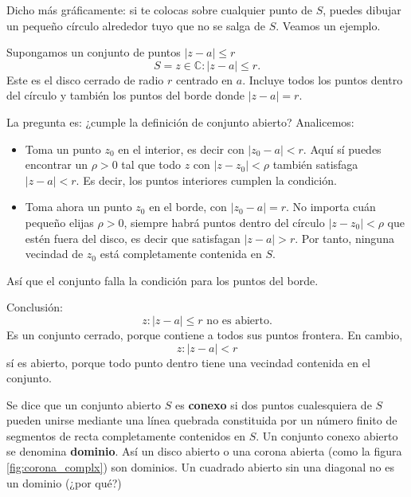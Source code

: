 Dicho más gráficamente: si te colocas sobre cualquier punto de \( S \), puedes dibujar un pequeño círculo alrededor tuyo que no se salga de \( S \). Veamos un ejemplo.
\begin{example}
  Supongamos un conjunto de puntos $\lvert z-a\rvert \leqslant r$
  \[
  S = {z \in \mathbb{C} : |z - a| \leqslant r}.
  \]
  Este es el disco cerrado de radio \(r\) centrado en \(a\). Incluye todos los puntos dentro del círculo y también los puntos del borde donde \(|z - a| = r\).

  La pregunta es: ¿cumple la definición de conjunto abierto? Analicemos:
  \begin{itemize}
  \item Toma un punto \(z_0\) en el interior, es decir con \(|z_0 - a| < r\).
   Aquí sí puedes encontrar un \(\rho > 0\) tal que todo \(z\) con \(|z - z_0| < \rho\) también satisfaga \(|z - a| < r\).
   Es decir, los puntos interiores cumplen la condición.

  \item Toma ahora un punto \(z_0\) en el borde, con \(|z_0 - a| = r\).
    No importa cuán pequeño elijas \(\rho > 0\), siempre habrá puntos dentro del círculo \(|z - z_0| < \rho\) que estén fuera del disco, es decir que satisfagan \(|z - a| > r\).
    Por tanto, ninguna vecindad de \(z_0\) está completamente contenida en \(S\).
  \end{itemize}
  Así que el conjunto falla la condición para los puntos del borde.

  Conclusión:
  \[
  \boxed{{z : |z - a| \le r} \text{ no es abierto.}}
  \]
  Es un conjunto cerrado, porque contiene a todos sus puntos frontera. En cambio,
  \[
  {z : |z - a| < r}
  \]
  sí es abierto, porque todo punto dentro tiene una vecindad contenida en el conjunto.
\end{example}

Se dice que un conjunto abierto $S$ es \textbf{conexo} si dos puntos cualesquiera de $S$ pueden unirse mediante una línea quebrada constituida por un número finito de segmentos de recta completamente contenidos en $S$. Un conjunto conexo abierto se denomina \textbf{dominio}. Así un disco abierto o una corona abierta (como la figura \ref{fig:corona_complx}) son dominios. Un cuadrado abierto sin una diagonal no es un dominio (¿por qué?)
